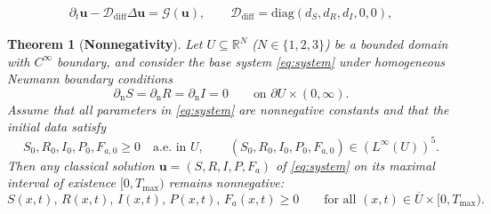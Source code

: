 \documentclass[10pt,a4paper]{amsart}
\newtheorem{theorem}{Theorem}
\begin{document}
\begin{align}
\label{eq:base_vector_form}
\partial_t\mathbf u-\mathcal D_{\mathrm{diff}}\Delta \mathbf u=\mathcal G(\mathbf u),
\qquad 
\mathcal D_{\mathrm{diff}}=\mathrm{diag}(d_S,d_R,d_I,0,0),
\end{align}

\begin{theorem}[\textbf{Nonnegativity}]
\label{thm:positivity}
Let $U\subseteq\mathbb{R}^N$ ($N\in\{1,2,3\}$) be a bounded domain with $C^\infty$ boundary, and consider the base system \eqref{eq:system} under homogeneous Neumann boundary conditions
\[
\partial_{\mathrm n}S=\partial_{\mathrm n}R=\partial_{\mathrm n}I=0 \qquad \text{on }\partial U\times(0,\infty).
\]
Assume that all parameters in \eqref{eq:system} are nonnegative constants and that the initial data satisfy
\[
S_0,R_0,I_0,P_0,F_{a,0}\ge 0 \quad \text{a.e.\ in }U,
\qquad 
(S_0,R_0,I_0,P_0,F_{a,0})\in (L^\infty(U))^5.
\]
Then any classical solution $\mathbf{u}=(S,R,I,P,F_a)$ of \eqref{eq:system} on its maximal interval of existence $[0,T_{\max})$ remains nonnegative:
\[
S(x,t),\,R(x,t),\,I(x,t),\,P(x,t),\,F_a(x,t)\ge 0
\qquad \text{for all }(x,t)\in \overline U\times[0,T_{\max}).
\]
\end{theorem}
\end{document}
